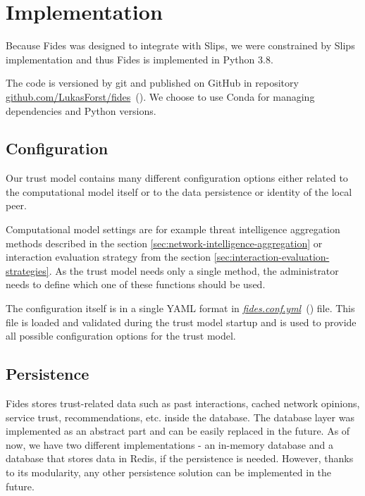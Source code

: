 \section{Implementation}
\label{sec:implementation}
Because Fides was designed to integrate with Slips, we were constrained by Slips implementation and thus Fides is implemented in Python 3.8.

The code is versioned by git and published on GitHub in repository \href{https://github.com/LukasForst/fides}{github.com/LukasForst/fides}~(\cite{fidesGithub}).
We choose to use Conda \cite{conda} for managing dependencies and Python versions.

\subsection{Configuration}
\label{subsec:configuration}
Our trust model contains many different configuration options either related to the computational model itself or to the data persistence or identity of the local peer.

Computational model settings are for example threat intelligence aggregation methods described in the section \ref{sec:network-intelligence-aggregation} or interaction evaluation strategy from the section \ref{sec:interaction-evaluation-strategies}.
As the trust model needs only a single method, the administrator needs to define which one of these functions should be used.

The configuration itself is in a single YAML \cite{yaml} format in \href{https://github.com/LukasForst/fides/blob/master/fides.conf.yml}{\textit{fides.conf.yml}}~(\cite{fidesGithub}) file.
This file is loaded and validated during the trust model startup and is used to provide all possible configuration options for the trust model.

\subsection{Persistence}
\label{subsec:persistence}
Fides stores trust-related data such as past interactions, cached network opinions, service trust, recommendations, etc. inside the database.
The database layer was implemented as an abstract part and can be easily replaced in the future.
As of now, we have two different implementations - an in-memory database and a database that stores data in Redis, if the persistence is needed.
However, thanks to its modularity, any other persistence solution can be implemented in the future.

